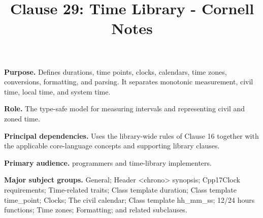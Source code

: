 \documentclass[11pt,letterpaper]{article}
\title{Clause 29: Time Library - Cornell Notes}
\author{}
\date{}
\begin{document}
\maketitle
\begin{CornellReferenceOrientationBox}
\textbf{Purpose.} Defines durations, time points, clocks, calendars, time zones, conversions, formatting, and parsing. It separates monotonic measurement, civil time, local time, and system time.
\par\textbf{Role.} The type-safe model for measuring intervals and representing civil and zoned time.
\par\textbf{Principal dependencies.} Uses the library-wide rules of Clause 16 together with the applicable core-language concepts and supporting library clauses.
\par\textbf{Primary audience.} programmers and time-library implementers.
\par\textbf{Major subject groups.} General; Header <chrono> synopsis; Cpp17Clock requirements; Time-related traits; Class template duration; Class template time\_\allowbreak{}point; Clocks; The civil calendar; Class template hh\_\allowbreak{}mm\_\allowbreak{}ss; 12/24 hours functions; Time zones; Formatting; and related subclauses.
\end{CornellReferenceOrientationBox}
\end{document}
